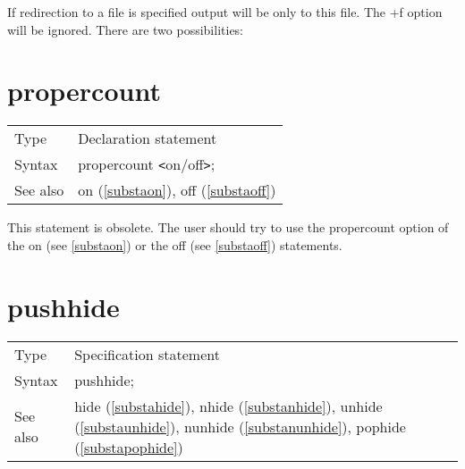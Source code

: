 
\noindent If redirection to a file is specified output will be only to this 
file. The +f option will be ignored. There are two possibilities:


\vspace{10mm}


\section{propercount}
\label{substapropercount}

\noindent \begin{tabular}{ll}
Type & Declaration statement\\
Syntax & propercount {\tt<}on/off{\tt>};
\\ See also & on (\ref{substaon}), off (\ref{substaoff})
\end{tabular} \vspace{4mm}

\noindent This statement is obsolete. 
The user should try to use the propercount option of the on (see 
\ref{substaon}) or the off (see \ref{substaoff}) statements. 
\vspace{10mm}


\section{pushhide}
\label{substapushhide}

\noindent \begin{tabular}{ll}
Type & Specification statement\\
Syntax & pushhide;
\\ See also & hide (\ref{substahide}),
              nhide (\ref{substanhide}),
              unhide (\ref{substaunhide}),
              nunhide (\ref{substanunhide}),
              pophide (\ref{substapophide})
\end{tabular} \vspace{4mm}

